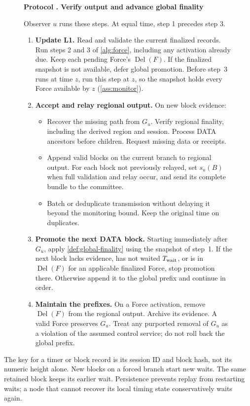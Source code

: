 \documentclass[11pt,a4paper]{article}
\newif\ifrevmarks
\newcommand{\Rv}[1]{\ifrevmarks\leavevmode{\color{rvBlue}#1}\else#1\fi}
\newcommand{\Cid}[1]{\ifrevmarks\textsuperscript{\hyperlink{chg:#1}{\color{rvBlue}\sffamily\scriptsize#1}}\fi}
\newcommand{\Del}{\operatorname{Del}}
\newcommand{\Twait}{T_{\rm wait}}
\newcounter{protocol}
\newenvironment{protocol}[2]{\begin{figure}[htbp]\refstepcounter{protocol}\label{#1}
\begin{mdframed}[linewidth=.6pt,skipabove=0pt,skipbelow=0pt,
innertopmargin=7pt,innerbottommargin=7pt]\small
\textbf{Protocol \theprotocol. #2}\par\smallskip}{\end{mdframed}\end{figure}}
\begin{document}
\begin{protocol}{alg:external}{Verify output and advance global finality}
Observer $u$ runs these steps. At equal time, step 1 precedes step 3.
\begin{enumerate}[label=\textbf{\arabic*)},itemsep=3pt]
\item \textbf{Update L1.} Read and validate the current finalized
records. Run \Rv{steps 2 and 3 of} \cref{alg:force}, including any activation already due.
Keep each pending Force's \Rv{$\Del(F)$}. If the finalized
snapshot is not available, defer global promotion.
\Rv{Before step~3 runs at time $z$, run this step at $z$, so the
snapshot holds every Force available by $z$ (\cref{ass:monitor}).}

\item \textbf{Accept and relay regional output.} On new block evidence:
\begin{itemize}
\item Recover the missing path from \Rv{$G_u$}. Verify
regional finality, including the derived region and \Rv{session}.
Process DATA ancestors before children. Request missing data or receipts.
\item Append valid blocks on the current branch to regional output.
For each block not previously relayed, set $s_u(B)$ when full validation
and relay occur, and send its complete bundle to the committee.
\item Batch or deduplicate transmission without delaying it beyond
the monitoring bound. Keep the original time on duplicates.
\end{itemize}

\item \textbf{Promote the next DATA block.} Starting immediately after
$G_u$, apply \cref{def:global-finality} using the \Rv{snapshot of step~1}.
If the next block lacks evidence, has not waited \Rv{$\Twait$}, or is
\Rv{in $\Del(F)$ for} an applicable finalized Force, stop promotion there.
Otherwise append it to the global prefix and continue in order.

\item \textbf{Maintain the prefixes.} On a Force activation, \Rv{remove
$\Del(F)$ from the regional output}. Archive \Rv{its} evidence. A valid Force preserves $G_u$. Treat any
purported removal of $G_u$ as a violation of the assumed control
service; do not roll back the global prefix.
\end{enumerate}
\end{protocol}

The key for a timer or block record is its \Rv{session ID} and block
hash, not its numeric height alone. New blocks on a forced branch start
new waits. The same retained block keeps its earlier wait. Persistence
prevents replay from restarting waits; a node that cannot recover its
local timing state conservatively waits again.
\end{document}
